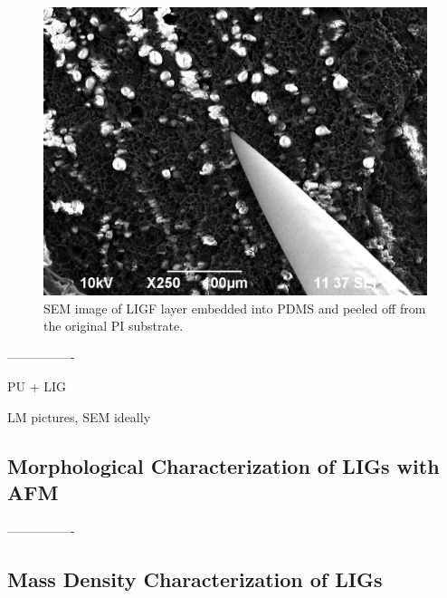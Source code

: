 \begin{figure}[H]
\centering
\includegraphics[width=1\textwidth]{Figures/Results/SEM/LIGF_PDMS_1.jpg}
\medskip
\captionsetup{width=0.7\linewidth}
\caption{SEM image of LIGF layer embedded into PDMS and peeled off from the original PI substrate. }
\label{fig:SEM6}
\end{figure}


----------------

PU + LIG 

LM pictures, SEM ideally


\subsection{Morphological Characterization of LIGs with AFM}

----------------

\subsection{Mass Density Characterization of LIGs}

